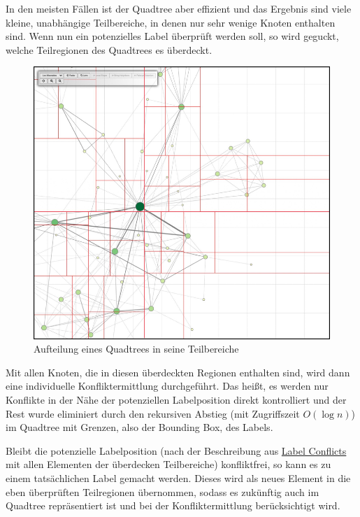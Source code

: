 In den meisten Fällen ist der Quadtree aber effizient und das Ergebnis sind viele kleine, unabhängige Teilbereiche, in denen nur sehr wenige Knoten enthalten sind.
Wenn nun ein potenzielles Label überprüft werden soll, so wird geguckt, welche Teilregionen des Quadtrees es überdeckt.

\begin{figure}[H]
    \centering
    \includegraphics[scale=0.33]{../img/quadtree}
    \caption{Aufteilung eines Quadtrees in seine Teilbereiche}
    \label{fig:quadtree}
\end{figure}

Mit allen Knoten, die in diesen überdeckten Regionen enthalten sind, wird dann eine individuelle Konfliktermittlung durchgeführt.
Das heißt, es werden nur Konflikte in der Nähe der potenziellen Labelposition direkt kontrolliert und der Rest wurde eliminiert
durch den rekursiven Abstieg (mit Zugriffszeit $O (\log n)$) im Quadtree mit Grenzen, also der Bounding Box, des Labels.

Bleibt die potenzielle Labelposition (nach der Beschreibung aus \hyperref[subsubsec:label_conflict]{Label Conflicts} mit allen Elementen der überdecken Teilbereiche) konfliktfrei,
so kann es zu einem tatsächlichen Label gemacht werden.
Dieses wird als neues Element in die eben überprüften Teilregionen übernommen, sodass es zukünftig auch im Quadtree repräsentiert ist und bei der Konfliktermittlung berücksichtigt wird.




